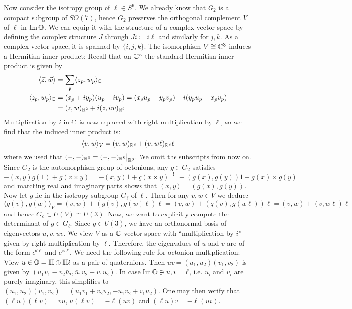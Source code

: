 \documentclass{scrartcl}
\begin{document}
\begin{myproof}
	\medskip
	
	Now consider the isotropy group of $\ell\in S^6$. We already know that $G_2$ is a compact subgroup of $SO(7)$, hence $G_2$ preserves the orthogonal complement $V$ of $\ell$ in $\operatorname{Im}\mathbb{O}$. We can equip it with the structure of a complex vector space by defining the complex structure $J$ through $Ji\coloneqq i\ell$ and similarly for $j,k$. As a complex vector space, it is spanned by $\{i,j,k\}$. The isomorphism $V\cong\mathbb{C}^3$ induces a Hermitian inner product: Recall that on $\mathbb{C}^n$ the standard Hermitian inner product is given by
	\begin{align*}
		\langle \vec z,\vec w\rangle&=\sum_p \langle z_p,w_p\rangle_{\mathbb{C}} \\
		\langle z_p,w_p\rangle_{\mathbb{C}}&=(x_p+iy_p)(u_p-iv_p)
		=(x_pu_p+y_pv_p)+i(y_pu_p-x_pv_p)\\
		&=(z,w)_{\mathbb{R}^2}+i(z,iw)_{\mathbb{R}^2} 
	\end{align*}
	Multiplication by $i$ in $\mathbb{C}$ is now replaced with right-multiplication by $\ell$, so we find that the induced inner product is:
	\begin{equation*}
		\langle v,w\rangle_V=(v,w)_{\mathbb{R}^8}+(v,w\ell)_{\mathbb{R}^8}\ell
	\end{equation*}
	where we used that $(-,-)_{\mathbb{R}^6}=(-,-)_{\mathbb{R}^8}\big|_{\mathbb{R}^6}$. We omit the subscripts from now on. Since $G_2$ is the automorphism group of octonions, any $g\in G_2$ satisfies
	\begin{equation*}
		-(x,y)g(1)+g(x\times y)=-(x,y)1+g(x\times y)
		\overset{!}{=}-(g(x),g(y))1+g(x)\times g(y)
	\end{equation*}
	and matching real and imaginary parts shows that $(x,y)=(g(x),g(y))$. Now let $g$ lie in the isotropy subgroup $G_\ell$ of $\ell$. Then for any $v,w\in V$ we deduce
	\begin{equation*}
		\langle g(v),g(w)\rangle_V=(v,w)+(g(v),g(w)\ell)\ell=(v,w)+(g(v),g(w\ell))\ell
		=(v,w)+(v,w\ell)\ell
	\end{equation*}
	and hence $G_\ell\subset U(V)\cong U(3)$. Now, we want to explicitly compute the determinant of $g\in G_\ell$. Since $g\in U(3)$, we have an orthonormal basis of eigenvectors $u,v,uv$. We view $V$ as a $\mathbb{C}$-vector space with ``multiplication by $i$'' given by right-multiplication by $\ell$. Therefore, the eigenvalues of $u$ and $v$ are of the form $e^{\theta\ell}$ and $e^{\varphi\ell}$. We need the following rule for octonion multiplication: View $u\in \mathbb{O}=\mathbb{H}\oplus\mathbb{H}\ell$ as a pair of quaternions. Then $uv=(u_1,u_2)(v_1,v_2)$ is given by $(u_1v_1-v_2\bar u_2,\bar u_1v_2+v_1u_2)$. In case $\operatorname{Im}\mathbb{O}\ni u,v\perp \ell$, i.e. $u_i$ and $v_i$ are purely imaginary, this simplifies to $(u_1,u_2)(v_1,v_2)=(u_1v_1+v_2u_2,-u_1v_2+v_1u_2)$. One may then verify that $(\ell u)(\ell v)=vu$, $u(\ell v)=-\ell(uv)$ and $(\ell u)v=-\ell(uv)$.
	

\end{myproof}
\end{document}
